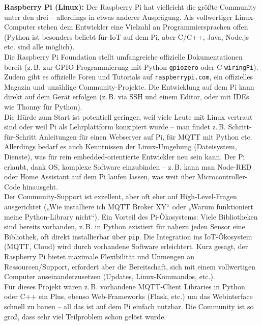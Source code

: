 \vspace{5mm}

\noindent\textbf{Raspberry Pi (Linux):} Der Raspberry Pi hat vielleicht die größte Community unter den drei – allerdings in etwas anderer Ausprägung. Als vollwertiger Linux-Computer stehen dem Entwickler eine Vielzahl an Programmiersprachen offen (Python ist besonders beliebt für IoT auf dem Pi, aber C/C++, Java, Node.js etc. sind alle möglich). \autocite{esp32_comparison} 
\\
Die Raspberry Pi Foundation stellt umfangreiche offizielle Dokumentationen bereit (z.\,B. zur GPIO-Programmierung mit Python \texttt{gpiozero} oder C \texttt{wiringPi}). \autocite{esp32_comparison} Zudem gibt es offizielle Foren und Tutorials auf \texttt{raspberrypi.com}, ein offizielles Magazin und unzählige Community-Projekte. Die Entwicklung auf dem Pi kann direkt auf dem Gerät erfolgen (z.\,B. via SSH und einem Editor, oder mit IDEs wie Thonny für Python). 
\\
Die Hürde zum Start ist potentiell geringer, weil viele Leute mit Linux vertraut sind oder weil Pi als Lehrplattform konzipiert wurde – man findet z.\,B. Schritt-für-Schritt Anleitungen für einen Webserver auf Pi, für MQTT mit Python etc. Allerdings bedarf es auch Kenntnissen der Linux-Umgebung (Dateisystem, Dienste), was für rein embedded-orientierte Entwickler neu sein kann. Der Pi erlaubt, dank OS, komplexe Software einzubinden – z.\,B. kann man Node-RED oder Home Assistant auf dem Pi laufen lassen, was weit über Microcontroller-Code hinausgeht. 
\\
Der Community-Support ist exzellent, aber oft eher auf High-Level-Fragen ausgerichtet („Wie installiere ich MQTT Broker XY“ oder „Warum funktioniert meine Python-Library nicht“). \autocite{esp32_comparison} Ein Vorteil des Pi-Ökosystems: Viele Bibliotheken sind bereits vorhanden, z.\,B. in Python existiert für nahezu jeden Sensor eine Bibliothek, oft direkt installierbar über \texttt{pip}. Die Integration ins IoT-Ökosystem (MQTT, Cloud) wird durch vorhandene Software erleichtert. Kurz gesagt, der Raspberry Pi bietet maximale Flexibilität und Unmengen an Ressourcen/Support, erfordert aber die Bereitschaft, sich mit einem vollwertigen Computer auseinanderzusetzen (Updates, Linux-Kommandos, etc.). 
\\
Für dieses Projekt wären z.\,B. vorhandene MQTT-Client Libraries in Python oder C++ ein Plus, ebenso Web-Frameworks (Flask, etc.) um das Webinterface schnell zu bauen – all das ist auf dem Pi einfach nutzbar. Die Community ist so groß, dass sehr viel Teilproblem schon gelöst wurde.



